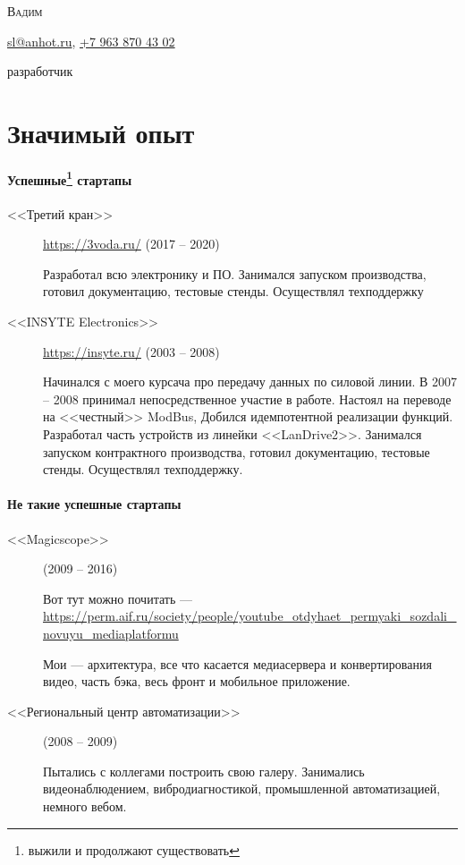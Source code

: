 \documentclass [a4paper,10pt]{article}
\begin{document}
\begin{center}
{\scshape\LARGE Вадим \par}
\Letter\hspace{6pt}\href{mailto:sl@anhot.ru}{sl@anhot.ru},
\Mobilefone\hspace{6pt}\href{tel:+79638704302}{+7 963 870 43 02}

разработчик
\end{center}
\section*{Значимый опыт}
\paragraph{Успешные\protect\footnote{выжили и продолжают существовать} стартапы}
\begin{description}
\item[<<Третий кран>>] \url{https://3voda.ru/} (2017 -- 2020)

Разработал всю электронику и ПО. Занимался запуском производства, готовил документацию, тестовые стенды. Осуществлял техподдержку

\item[<<INSYTE Electronics>>] \url{https://insyte.ru/} (2003 -- 2008)

Начинался с моего курсача про передачу данных по силовой линии. В 2007 -- 2008 принимал непосредственное участие в работе.
Настоял на переводе на <<честный>> ModBus, Добился идемпотентной реализации функций. Разработал часть устройств из линейки <<LanDrive2>>.
Занимался запуском контрактного производства, готовил документацию, тестовые стенды. Осуществлял техподдержку.
\end{description}

\paragraph{Не такие успешные стартапы}
\begin{description}
\item[<<Magicscope>>] (2009 -- 2016)

Вот тут можно почитать --- \url{https://perm.aif.ru/society/people/youtube_otdyhaet_permyaki_sozdali_novuyu_mediaplatformu}

Мои --- архитектура, все что касается медиасервера и конвертирования видео, часть бэка, весь фронт и мобильное приложение.

\item[<<Региональный центр автоматизации>>] (2008 -- 2009)

Пытались с коллегами построить свою галеру. Занимались видеонаблюдением, вибродиагностикой, промышленной автоматизацией, немного вебом.
\end{description}
\end{document}
